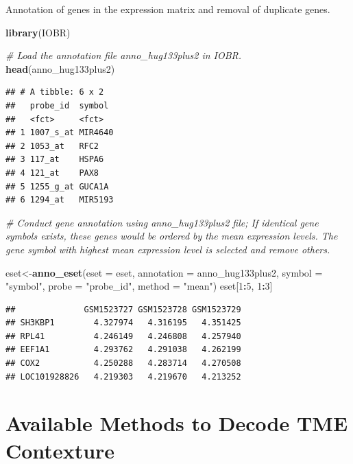 \documentclass[
  12pt,
]{book}
\newenvironment{Shaded}{\begin{snugshade}}{\end{snugshade}}
\newcommand{\AttributeTok}[1]{\textcolor[rgb]{0.13,0.29,0.53}{#1}}
\newcommand{\CommentTok}[1]{\textcolor[rgb]{0.56,0.35,0.01}{\textit{#1}}}
\newcommand{\DecValTok}[1]{\textcolor[rgb]{0.00,0.00,0.81}{#1}}
\newcommand{\FunctionTok}[1]{\textcolor[rgb]{0.13,0.29,0.53}{\textbf{#1}}}
\newcommand{\NormalTok}[1]{#1}
\newcommand{\OtherTok}[1]{\textcolor[rgb]{0.56,0.35,0.01}{#1}}
\newcommand{\SpecialCharTok}[1]{\textcolor[rgb]{0.81,0.36,0.00}{\textbf{#1}}}
\newcommand{\StringTok}[1]{\textcolor[rgb]{0.31,0.60,0.02}{#1}}
\theoremstyle{definition}
\theoremstyle{definition}
\theoremstyle{definition}
\theoremstyle{definition}
\theoremstyle{remark}
\begin{document}
Annotation of genes in the expression matrix and removal of duplicate genes.

\begin{Shaded}
\begin{Highlighting}[]
\FunctionTok{library}\NormalTok{(IOBR)}

\CommentTok{\# Load the annotation file \textasciigrave{}anno\_hug133plus2\textasciigrave{} in IOBR.}
\FunctionTok{head}\NormalTok{(anno\_hug133plus2)}
\end{Highlighting}
\end{Shaded}

\begin{verbatim}
## # A tibble: 6 x 2
##   probe_id  symbol 
##   <fct>     <fct>  
## 1 1007_s_at MIR4640
## 2 1053_at   RFC2   
## 3 117_at    HSPA6  
## 4 121_at    PAX8   
## 5 1255_g_at GUCA1A 
## 6 1294_at   MIR5193
\end{verbatim}

\begin{Shaded}
\begin{Highlighting}[]
\CommentTok{\# Conduct gene annotation using \textasciigrave{}anno\_hug133plus2\textasciigrave{} file; If identical gene symbols exists, these genes would be ordered by the mean expression levels. The gene symbol with highest mean expression level is selected and remove others. }

\NormalTok{eset}\OtherTok{\textless{}{-}}\FunctionTok{anno\_eset}\NormalTok{(}\AttributeTok{eset       =}\NormalTok{ eset,}
                \AttributeTok{annotation =}\NormalTok{ anno\_hug133plus2,}
                \AttributeTok{symbol     =} \StringTok{"symbol"}\NormalTok{,}
                \AttributeTok{probe      =} \StringTok{"probe\_id"}\NormalTok{,}
                \AttributeTok{method     =} \StringTok{"mean"}\NormalTok{)}
\NormalTok{eset[}\DecValTok{1}\SpecialCharTok{:}\DecValTok{5}\NormalTok{, }\DecValTok{1}\SpecialCharTok{:}\DecValTok{3}\NormalTok{]}
\end{Highlighting}
\end{Shaded}

\begin{verbatim}
##              GSM1523727 GSM1523728 GSM1523729
## SH3KBP1        4.327974   4.316195   4.351425
## RPL41          4.246149   4.246808   4.257940
## EEF1A1         4.293762   4.291038   4.262199
## COX2           4.250288   4.283714   4.270508
## LOC101928826   4.219303   4.219670   4.213252
\end{verbatim}

\hypertarget{available-methods-to-decode-tme-contexture}{%
\section{Available Methods to Decode TME Contexture}\label{available-methods-to-decode-tme-contexture}}
\end{document}
